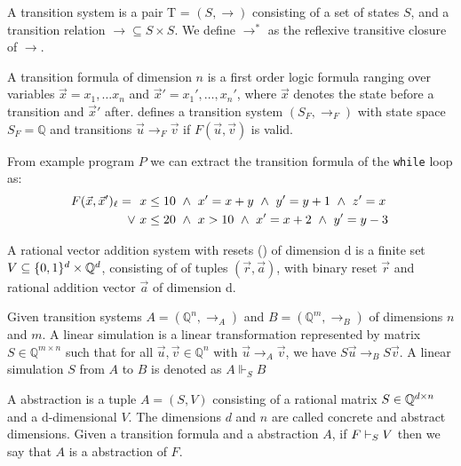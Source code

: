 \begin{mydef}
A transition system is a pair T = $(S, \rightarrow)$ consisting of a set of states $S$, and a transition relation $\rightarrow \subseteq S \times S$. We define $\rightarrow^*$ as the reflexive transitive closure of $\rightarrow$.
\end{mydef}

\begin{mydef}
A transition formula \tranFormula of dimension $n$ is a first order logic formula ranging over variables $\vec{x} = x_1, \ldots x_n$ and $\vec{x}' = x_1', \ldots, x_n'$, where $\vec{x}$ denotes the state before a transition and $\vec{x}'$ after. \tranFormula defines a transition system $(S_F, \rightarrow_F)$ with state space $S_F = \mathbb{Q}$ and transitions $\vec{u} \rightarrow_F \vec{v}$ if $F(\vec{u}, \vec{v})$ is valid.
\end{mydef}
\begin{example}
    From example program $P$ we can extract the transition formula of the \texttt{while} loop as:
    \begin{align*}
    \tranFormula_\ell =\ \  &x \leq 10 \ \land\ x' = x + y\ \land\ y' = y+1\ \land\ z' = x\ \\ \lor\ & x \leq 20\ \land\ x > 10\ \land\ x' = x + 2\ \land\ y' = y - 3
    \end{align*}
\end{example}

\begin{mydef}
A rational vector addition system with resets (\qvasr) of dimension d is a finite set $V \subseteq \{0, 1\}^d \times \mathbb{Q}^d$, consisting of of tuples $(\vec{r}, \vec{a})$, with binary reset $\vec{r}$ and rational addition vector $\vec{a}$ of dimension d.
\end{mydef}

\begin{mydef}
Given transition systems $A = (\mathbb{Q}^n, \rightarrow_A)$ and $B = (\mathbb{Q}^m, \rightarrow_B)$ of dimensions $n$ and $m$. A linear simulation is a linear transformation represented by matrix $S \in \mathbb{Q}^{m \times n}$ such that for all $\vec{u}, \vec{v} \in \mathbb{Q}^n$ with $\vec{u} \rightarrow_A \vec{v}$, we have $S\vec{u} \rightarrow_B S\vec{v}$. A linear simulation $S$ from $A$ to $B$ is denoted as $A \Vdash_{S} B$
\end{mydef}

\begin{mydef}
A \qvasr abstraction is a tuple $A = (S, V)$ consisting of a rational matrix $S \in \mathbb{Q}^{d \times n}$ and a d-dimensional \qvasr $V$. The dimensions $d$ and $n$ are called concrete and abstract dimensions.
Given a transition formula \tranFormula and a \qvasr abstraction $A$, if $F \vdash_{S} V$ then we say that $A$ is a \qvasr abstraction of $F$.
\end{mydef}


